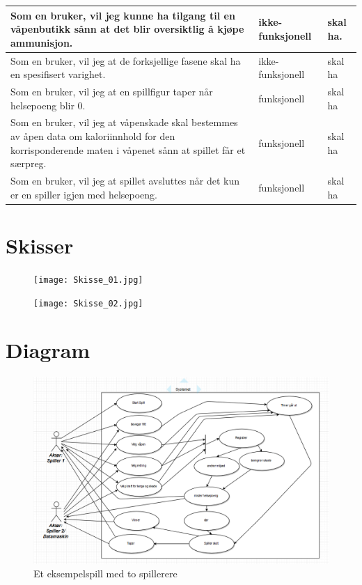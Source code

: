 \documentclass[norsk,a4paper]{article}
\begin{document}
\begin{center}
\begin{tabular}{ | p{5.5cm} | l | l |}
 Som en bruker, vil jeg kunne ha tilgang til en våpenbutikk sånn at det blir oversiktlig å kjøpe ammunisjon. & ikke-funksjonell & skal ha.
 \\ \hline
 Som en bruker, vil jeg at de forksjellige fasene skal ha en spesifisert varighet. & ikke-funksjonell & skal ha
 \\ \hline
 Som en bruker, vil jeg at en spillfigur taper når helsepoeng blir 0. & funksjonell & skal ha
  \\ \hline
  Som en bruker, vil jeg at våpenskade skal bestemmes av åpen data om kaloriinnhold for den korrisponderende maten i våpenet sånn at spillet får et særpreg. & funksjonell & skal ha
  \\ \hline
  Som en bruker, vil jeg at spillet avsluttes når det kun er en spiller igjen med helsepoeng. & funksjonell & skal ha
  \\ \hline
 
  
    \end{tabular}
\end{center}

\newpage




%

\section{Skisser}
\begin{figure}[!htb]

\texttt{[image: Skisse\_01.jpg]}


\texttt{[image: Skisse\_02.jpg]}
\end{figure}



\newpage
\section{Diagram}
\begin{figure}[!thb]
\centering
\includegraphics[width=1\textwidth]{uml_diagram.png}
\captionsetup{labelformat=empty}
\caption{Et eksempelspill med to spillerere}
\end{figure}
\end{document}
